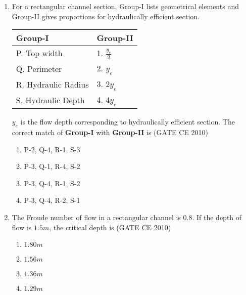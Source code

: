 \documentclass[journal]{IEEEtran}
\begin{document}
\begin{enumerate}
        
    \item For a rectangular channel section, Group-I lists geometrical elements and Group-II gives proportions for hydraulically efficient section.
    \begin{table}[h!]
        \begin{center}
            \begin{tabular}{l|l}
            \textbf{Group-I} & \textbf{Group-II} \\ \hline
            P. Top width & 1. $\frac{y_e}{2}$ \\
            Q. Perimeter & 2. $y_e$ \\
            R. Hydraulic Radius & 3. $2y_e$ \\
            S. Hydraulic Depth & 4. $4y_e$ \\
            \end{tabular}
        \end{center}
    \end{table}

    $y_e$ is the flow depth corresponding to hydraulically efficient section. The correct match of \textbf{Group-I} with \textbf{Group-II} is \hfill (GATE CE 2010)
    \begin{multicols}{2}
        \begin{enumerate}
            \item P-2, Q-4, R-1, S-3
            \item P-3, Q-1, R-4, S-2
            \item P-3, Q-4, R-1, S-2
            \item P-3, Q-4, R-2, S-1
        \end{enumerate}
    \end{multicols}

    \item The Froude number of flow in a rectangular channel is 0.8. If the depth of flow is $1.5 m$, the critical depth is \hfill (GATE CE 2010)
    \begin{multicols}{4}
        \begin{enumerate}
            \item $1.80 m$
            \item $1.56 m$
            \item $1.36 m$
            \item $1.29 m$
        \end{enumerate}
    \end{multicols}


\end{enumerate}
\end{document}
